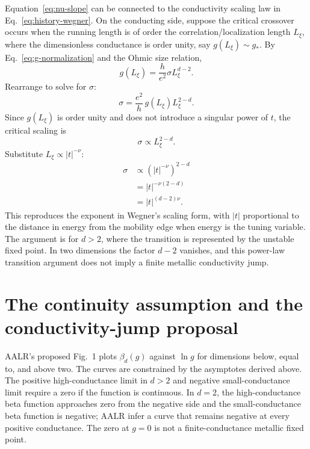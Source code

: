 \documentclass[11pt,a4paper]{article}
\numberwithin{equation}{section}
\begin{document}
Equation~\eqref{eq:nu-slope} can be connected to the conductivity scaling law in Eq.~\eqref{eq:history-wegner}. On the conducting side, suppose the critical crossover occurs when the running length is of order the correlation/localization length $L_\xi$, where the dimensionless conductance is order unity, say $g(L_\xi)\sim g_*$. By Eq.~\eqref{eq:g-normalization} and the Ohmic size relation,
\begin{equation}
    g(L_\xi)=\frac{h}{e^2}\sigma L_\xi^{d-2}.
\end{equation}
Rearrange to solve for $\sigma$:
\begin{equation}
    \sigma=\frac{e^2}{h}\,g(L_\xi)L_\xi^{2-d}.
\end{equation}
Since $g(L_\xi)$ is order unity and does not introduce a singular power of $t$, the critical scaling is
\begin{equation}
    \sigma\propto L_\xi^{2-d}.
\end{equation}
Substitute $L_\xi\propto |t|^{-\nu}$:
\begin{align}
    \sigma&\propto\left(|t|^{-\nu}\right)^{2-d}\\
    &=|t|^{-\nu(2-d)}\\
    &=|t|^{(d-2)\nu}.
\end{align}
This reproduces the exponent in Wegner's scaling form, with $|t|$ proportional to the distance in energy from the mobility edge when energy is the tuning variable. The argument is for $d>2$, where the transition is represented by the unstable fixed point. In two dimensions the factor $d-2$ vanishes, and this power-law transition argument does not imply a finite metallic conductivity jump.

\section{The continuity assumption and the conductivity-jump proposal}

AALR's proposed Fig.~1 plots $\beta_d(g)$ against $\ln g$ for dimensions below, equal to, and above two. The curves are constrained by the asymptotes derived above. The positive high-conductance limit in $d>2$ and negative small-conductance limit require a zero if the function is continuous. In $d=2$, the high-conductance beta function approaches zero from the negative side and the small-conductance beta function is negative; AALR infer a curve that remains negative at every positive conductance. The zero at $g=0$ is not a finite-conductance metallic fixed point.
\end{document}
